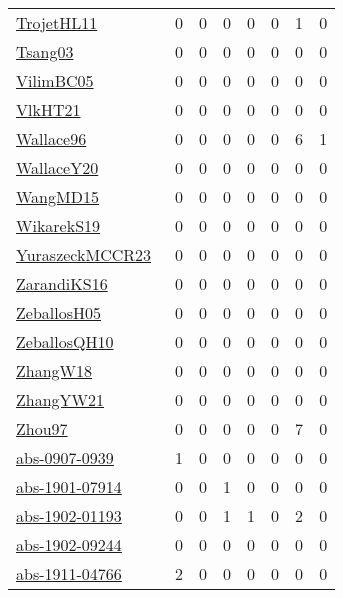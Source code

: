 {\begin{longtable}{l*{7}{r}}
\href{articles/TrojetHL11.pdf}{TrojetHL11}~\cite{TrojetHL11} & 0 & 0 & 0 & 0 & 0 & 1 & 0\\
\href{articles/Tsang03.pdf}{Tsang03}~\cite{Tsang03} & 0 & 0 & 0 & 0 & 0 & 0 & 0\\
\href{articles/VilimBC05.pdf}{VilimBC05}~\cite{VilimBC05} & 0 & 0 & 0 & 0 & 0 & 0 & 0\\
\href{articles/VlkHT21.pdf}{VlkHT21}~\cite{VlkHT21} & 0 & 0 & 0 & 0 & 0 & 0 & 0\\
\href{articles/Wallace96.pdf}{Wallace96}~\cite{Wallace96} & 0 & 0 & 0 & 0 & 0 & 6 & 1\\
\href{articles/WallaceY20.pdf}{WallaceY20}~\cite{WallaceY20} & 0 & 0 & 0 & 0 & 0 & 0 & 0\\
\href{articles/WangMD15.pdf}{WangMD15}~\cite{WangMD15} & 0 & 0 & 0 & 0 & 0 & 0 & 0\\
\href{articles/WikarekS19.pdf}{WikarekS19}~\cite{WikarekS19} & 0 & 0 & 0 & 0 & 0 & 0 & 0\\
\href{articles/YuraszeckMCCR23.pdf}{YuraszeckMCCR23}~\cite{YuraszeckMCCR23} & 0 & 0 & 0 & 0 & 0 & 0 & 0\\
\href{articles/ZarandiKS16.pdf}{ZarandiKS16}~\cite{ZarandiKS16} & 0 & 0 & 0 & 0 & 0 & 0 & 0\\
\href{articles/ZeballosH05.pdf}{ZeballosH05}~\cite{ZeballosH05} & 0 & 0 & 0 & 0 & 0 & 0 & 0\\
\href{articles/ZeballosQH10.pdf}{ZeballosQH10}~\cite{ZeballosQH10} & 0 & 0 & 0 & 0 & 0 & 0 & 0\\
\href{articles/ZhangW18.pdf}{ZhangW18}~\cite{ZhangW18} & 0 & 0 & 0 & 0 & 0 & 0 & 0\\
\href{articles/ZhangYW21.pdf}{ZhangYW21}~\cite{ZhangYW21} & 0 & 0 & 0 & 0 & 0 & 0 & 0\\
\href{articles/Zhou97.pdf}{Zhou97}~\cite{Zhou97} & 0 & 0 & 0 & 0 & 0 & 7 & 0\\
\href{articles/abs-0907-0939.pdf}{abs-0907-0939}~\cite{abs-0907-0939} & 1 & 0 & 0 & 0 & 0 & 0 & 0\\
\href{articles/abs-1901-07914.pdf}{abs-1901-07914}~\cite{abs-1901-07914} & 0 & 0 & 1 & 0 & 0 & 0 & 0\\
\href{articles/abs-1902-01193.pdf}{abs-1902-01193}~\cite{abs-1902-01193} & 0 & 0 & 1 & 1 & 0 & 2 & 0\\
\href{articles/abs-1902-09244.pdf}{abs-1902-09244}~\cite{abs-1902-09244} & 0 & 0 & 0 & 0 & 0 & 0 & 0\\
\href{articles/abs-1911-04766.pdf}{abs-1911-04766}~\cite{abs-1911-04766} & 2 & 0 & 0 & 0 & 0 & 0 & 0\\

\end{longtable}}
